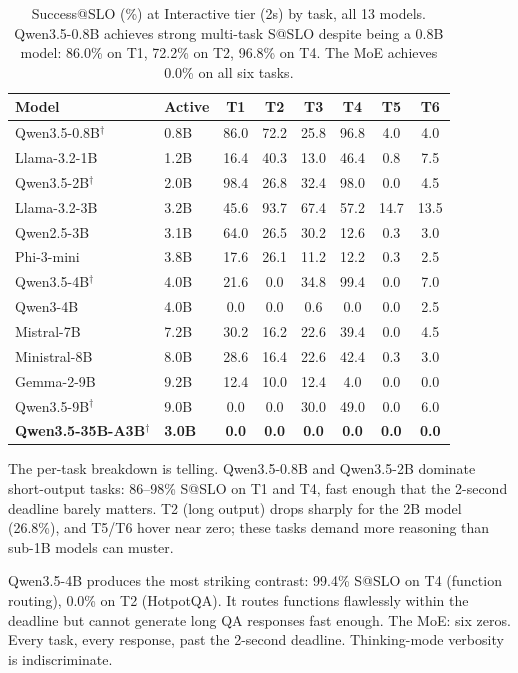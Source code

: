 \documentclass[11pt]{article}
\begin{document}
\begin{table}[t]
\centering
\caption{Success@SLO (\%) at Interactive tier (2s) by task, all 13 models.  Qwen3.5-0.8B achieves strong multi-task S@SLO despite being a 0.8B model: 86.0\% on T1, 72.2\% on T2, 96.8\% on T4.  The MoE achieves 0.0\% on all six tasks.}
\label{tab:sslo-by-task}
\small
\begin{tabular}{ll cccccc}
\toprule
\textbf{Model} & \textbf{Active} & \textbf{T1} & \textbf{T2} & \textbf{T3} & \textbf{T4} & \textbf{T5} & \textbf{T6} \\
\midrule
Qwen3.5-0.8B$^\dagger$ & 0.8B & 86.0 & 72.2 & 25.8 & 96.8 & 4.0 & 4.0 \\
Llama-3.2-1B & 1.2B & 16.4 & 40.3 & 13.0 & 46.4 & 0.8 & 7.5 \\
Qwen3.5-2B$^\dagger$ & 2.0B & 98.4 & 26.8 & 32.4 & 98.0 & 0.0 & 4.5 \\
Llama-3.2-3B & 3.2B & 45.6 & 93.7 & 67.4 & 57.2 & 14.7 & 13.5 \\
Qwen2.5-3B & 3.1B & 64.0 & 26.5 & 30.2 & 12.6 & 0.3 & 3.0 \\
Phi-3-mini & 3.8B & 17.6 & 26.1 & 11.2 & 12.2 & 0.3 & 2.5 \\
Qwen3.5-4B$^\dagger$ & 4.0B & 21.6 & 0.0 & 34.8 & 99.4 & 0.0 & 7.0 \\
Qwen3-4B & 4.0B & 0.0 & 0.0 & 0.6 & 0.0 & 0.0 & 2.5 \\
Mistral-7B & 7.2B & 30.2 & 16.2 & 22.6 & 39.4 & 0.0 & 4.5 \\
Ministral-8B & 8.0B & 28.6 & 16.4 & 22.6 & 42.4 & 0.3 & 3.0 \\
Gemma-2-9B & 9.2B & 12.4 & 10.0 & 12.4 & 4.0  & 0.0 & 0.0 \\
Qwen3.5-9B$^\dagger$ & 9.0B & 0.0 & 0.0 & 30.0 & 49.0 & 0.0 & 6.0 \\
\midrule
\rowcolor{moepurple!8}
\textbf{Qwen3.5-35B-A3B}$^\dagger$ & \textbf{3.0B} & \textbf{0.0} & \textbf{0.0} & \textbf{0.0} & \textbf{0.0} & \textbf{0.0} & \textbf{0.0} \\
\bottomrule
\end{tabular}
\end{table}

The per-task breakdown is telling.  Qwen3.5-0.8B and Qwen3.5-2B dominate short-output tasks: 86--98\% S@SLO on T1 and T4, fast enough that the 2-second deadline barely matters.  T2 (long output) drops sharply for the 2B model (26.8\%), and T5/T6 hover near zero; these tasks demand more reasoning than sub-1B models can muster.

Qwen3.5-4B produces the most striking contrast: 99.4\% S@SLO on T4 (function routing), 0.0\% on T2 (HotpotQA).  It routes functions flawlessly within the deadline but cannot generate long QA responses fast enough.  The MoE: six zeros.  Every task, every response, past the 2-second deadline.  Thinking-mode verbosity is indiscriminate.
\end{document}
